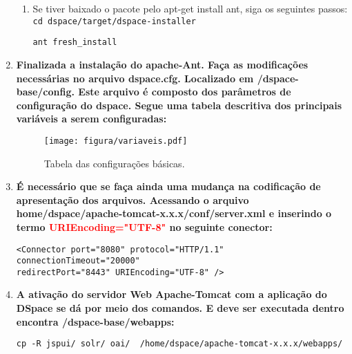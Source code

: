 \documentclass[12pt,hidelinks]{article}
\begin{document}
\begin{enumerate}
\begin{enumerate}
            \item Se tiver baixado o pacote pelo apt-get install ant, siga os seguintes passos:\\
            
            \texttt{cd dspace/target/dspace-installer}\\
            
            \begin{verbatim}
ant fresh_install
            \end{verbatim}

            \end{enumerate}
            
        \item \textbf{Finalizada a instalação do apache-Ant. Faça as modificações necessárias no arquivo dspace.cfg. Localizado em /dspace-base/config. Este arquivo é composto dos parâmetros de configuração do dspace. Segue uma tabela descritiva dos principais variáveis a serem configuradas:}
            
        \begin{figure}[!ph]
            \centering
            \texttt{[image: figura/variaveis.pdf]}
            \caption{Tabela das configurações básicas.}
        \label{Rotulo}
        \end{figure}
        
        
        \newpage

        \item \textbf{É necessário que se faça ainda uma mudança na codificação de apresentação dos arquivos. Acessando o arquivo home/dspace/apache-tomcat-x.x.x/conf/server.xml e inserindo o termo \textcolor{red}{URIEncoding="UTF-8"} no seguinte conector:}
        
            \texttt{<Connector port="8080" protocol="HTTP/1.1"\\
                    connectionTimeout="20000"\\
                    redirectPort="8443" URIEncoding="UTF-8" />}\\
            
        
        \item \textbf{A ativação do servidor Web Apache-Tomcat com a aplicação do DSpace se dá por meio dos comandos. E deve ser executada dentro encontra /dspace-base/webapps:}\\
            
         \begin{verbatim}
cp -R jspui/ solr/ oai/  /home/dspace/apache-tomcat-x.x.x/webapps/
         \end{verbatim}
         

\end{enumerate}
\end{document}
